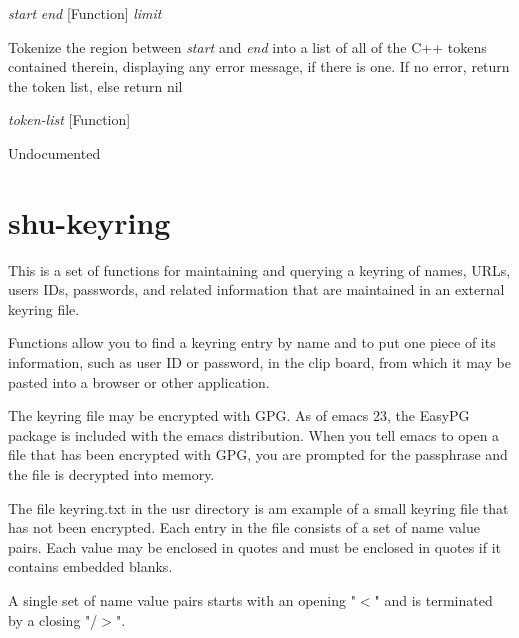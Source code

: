 \vspace{1em}
\noindent
{}
\usebox{\funcname}\emph{start} \emph{end}
 \hfill [Function]
\hspace*{\wd\funcname}\emph{limit}

\begin{doc-string}
Tokenize the region between \emph{start} and \emph{end} into a list of all of the C++
tokens contained therein, displaying any error message, if there is one.  If no
error, return the token list, else return nil
\end{doc-string}

\vspace{1em}
\noindent
{}
\usebox{\funcname}\emph{token-list}
 \hfill [Function]

\begin{doc-string}
Undocumented
\end{doc-string}

\eject
\section{shu-keyring}


This is a set of functions for maintaining and querying a keyring of names,
URLs, users IDs, passwords, and related information that are maintained in an
external keyring file.

Functions allow you to find a keyring entry by name and to put one piece of
its information, such as user ID or password, in the clip board, from which it
may be pasted into a browser or other application.

The keyring file may be encrypted with GPG.  As of emacs 23, the EasyPG
package is included with the emacs distribution.  When you tell emacs to open
a file that has been encrypted with GPG, you are prompted for the passphrase
and the file is decrypted into memory.

The file keyring.txt in the usr directory is am example of a small
keyring file that has not been encrypted.  Each entry in the file consists of
a set of name value pairs.  Each value may be enclosed in quotes and must be
enclosed in quotes if it contains embedded blanks.

A single set of name value pairs starts with an opening "$<$" and is terminated
by a closing "/$>$".

